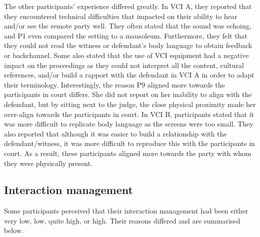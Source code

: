 \documentclass[output=paper]{langsci/langscibook}
\begin{document}
The other participants’ experience differed greatly. In \textsc{VCI} A, they reported that they encountered technical difficulties that impacted on their ability to hear and/or see the remote party well. They often stated that the sound was echoing, and P1 even compared the setting to a mausoleum. Furthermore, they felt that they could not read the witness or defendant’s body language to obtain feedback or backchannel. Some also stated that the use of \textsc{VCI} equipment had a negative impact on the proceedings as they could not interpret all the content, cultural references, and/or build a rapport with the defendant in \textsc{VCI} A in order to adapt their terminology. Interestingly, the reason P9 aligned more towards the participants in court differs. She did not report on her inability to align with the defendant, but by sitting next to the judge, the close physical proximity made her over-align towards the participants in court. In \textsc{VCI} B, participants stated that it was more difficult to replicate body language as the screens were too small. They also reported that although it was easier to build a relationship with the defendant/witness, it was more difficult to reproduce this with the participants in court. As a result, these participants aligned more towards the party with whom they were physically present. 

\subsection{Interaction management} 

Some participants perceived that their interaction management had been either very low, low, quite high, or high. Their reasons differed and are summarised below. 
\end{document}
